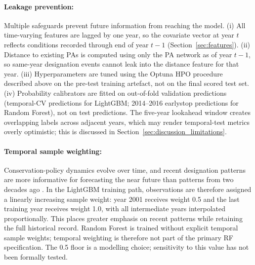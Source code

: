 \documentclass[12pt]{article}
\theoremstyle{break}
\begin{document}
\paragraph{Leakage prevention:}
Multiple safeguards prevent future information from reaching the model. (i) All
time-varying features are lagged by one year, so the covariate vector at year $t$
reflects conditions recorded through end of year $t-1$ (Section~\ref{sec:features}).
(ii) Distance to existing PAs is computed using only the PA network as of year $t-1$,
so same-year designation events cannot leak into the distance feature for that year.
(iii) Hyperparameters are tuned using the Optuna HPO procedure described above on the
pre-test training artefact, not on the final scored test set. (iv) Probability
calibrators are fitted on out-of-fold validation predictions (temporal-CV predictions
for LightGBM; 2014--2016 earlystop predictions for Random Forest), not on test
predictions. The five-year lookahead window creates overlapping labels across adjacent years, which
may render temporal-test metrics overly optimistic; this is discussed in
Section~\ref{sec:discussion_limitations}.

\paragraph{Temporal sample weighting:}
Conservation-policy dynamics evolve over time, and recent designation patterns are
more informative for forecasting the near future than patterns from two decades ago
\citep{gama2014}.
In the LightGBM training path, observations are therefore assigned a linearly
increasing sample weight: year 2001 receives weight 0.5 and the last training year
receives weight 1.0, with all intermediate years interpolated proportionally. This
places greater emphasis on recent patterns while retaining the full historical record.
Random Forest is trained without explicit temporal sample weights; temporal weighting
is therefore not part of the primary RF specification. The 0.5 floor is a modelling
choice; sensitivity to this value has not been formally tested.
\end{document}
